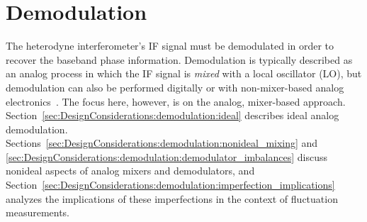 \section{Demodulation}
\label{sec:DesignConsiderations:demodulation}
The heterodyne interferometer's IF signal must be demodulated
in order to recover the baseband phase information.
Demodulation is typically described as an analog process
in which the IF signal is \emph{mixed} with a local oscillator (LO), but
demodulation can also be performed digitally
\cite{vanzeeland_rsi08, mlynek_fst12} or
with non-mixer-based analog electronics~\cite{mlynek_rsi17}.
The focus here, however, is on the analog, mixer-based approach.
Section~\ref{sec:DesignConsiderations:demodulation:ideal}
describes ideal analog demodulation.
Sections~\ref{sec:DesignConsiderations:demodulation:nonideal_mixing} and
\ref{sec:DesignConsiderations:demodulation:demodulator_imbalances}
discuss nonideal aspects of analog mixers and demodulators, and
Section~\ref{sec:DesignConsiderations:demodulation:imperfection_implications}
analyzes the implications of these imperfections
in the context of fluctuation measurements.


